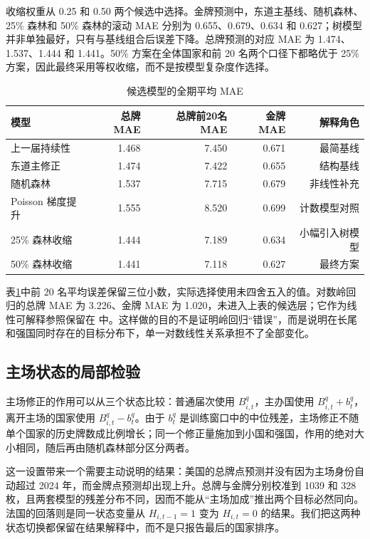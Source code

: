 \documentclass[UTF8,11pt,a4paper]{ctexart}
\begin{document}
收缩权重从 0.25 和 0.50 两个候选中选择。金牌预测中，东道主基线、随机森林、25\% 森林和 50\% 森林的滚动 MAE 分别为 0.655、0.679、0.634 和 0.627；树模型并非单独最好，只有与基线组合后误差下降。总牌预测的对应 MAE 为 1.474、1.537、1.444 和 1.441。50\% 方案在全体国家和前 20 名两个口径下都略优于 25\% 方案，因此最终采用等权收缩，而不是按模型复杂度作选择。

\begin{table}[H]
\centering
\caption{候选模型的全期平均 MAE}
\label{tab:model-comparison}
\small
\begin{tabular}{lrrrr}
\toprule
模型 & 总牌 MAE & 总牌前20名 MAE & 金牌 MAE & 解释角色\\
\midrule
上一届持续性 & 1.468 & 7.450 & 0.671 & 最简基线\\
东道主修正 & 1.474 & 7.422 & 0.655 & 结构基线\\
随机森林 & 1.537 & 7.715 & 0.679 & 非线性补充\\
Poisson 梯度提升 & 1.555 & 8.520 & 0.699 & 计数模型对照\\
25\% 森林收缩 & 1.444 & 7.189 & 0.634 & 小幅引入树模型\\
50\% 森林收缩 & 1.441 & 7.118 & 0.627 & 最终方案\\
\bottomrule
\end{tabular}
\end{table}

表\ref{tab:model-comparison}中前 20 名平均误差保留三位小数，实际选择使用未四舍五入的值。对数岭回归的总牌 MAE 为 3.226、金牌 MAE 为 1.020，未进入上表的候选层；它作为线性可解释参照保留在  中。这样做的目的不是证明岭回归“错误”，而是说明在长尾和强国同时存在的目标分布下，单一对数线性关系承担不了全部变化。

\subsection{主场状态的局部检验}

主场修正的作用可以从三个状态比较：普通届次使用 $B^q_{i,t}$，主办国使用 $B^q_{i,t}+b^q_t$，离开主场的国家使用 $B^q_{i,t}-b^q_t$。由于 $b^q_t$ 是训练窗口中的中位残差，主场修正不随单个国家的历史牌数成比例增长；同一个修正量施加到小国和强国，作用的绝对大小相同，随后再由随机森林部分区分两者。

这一设置带来一个需要主动说明的结果：美国的总牌点预测并没有因为主场身份自动超过 2024 年，而金牌点预测却出现上升。总牌与金牌分别校准到 1039 和 328 枚，且两套模型的残差分布不同，因而不能从“主场加成”推出两个目标必然同向。法国的回落则是同一状态变量从 $H_{i,t-1}=1$ 变为 $H_{i,t}=0$ 的结果。我们把这两种状态切换都保留在结果解释中，而不是只报告最后的国家排序。
\end{document}

